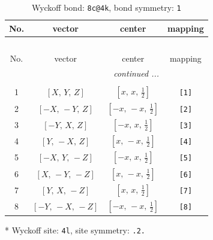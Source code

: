 \documentclass[fleqn,8pt]{jsarticle}
\begin{document}
\renewcommand{\arraystretch}{1.2}
\begin{longtable}{cccc}
\caption{Wyckoff bond: {\tt 8c@4k}, bond symmetry: {\tt 1}}
 \\
 \hline \hline
No. & vector & center & mapping \\ \hline \endfirsthead

\multicolumn{3}{l}{\tablename\ \thetable{}} \\
 \hline \hline
No. & vector & center & mapping \\ \hline \endhead

 \hline \hline
\multicolumn{3}{r}{\footnotesize\it continued ...} \\ \endfoot

 \hline \hline
\multicolumn{3}{r}{} \\ \endlastfoot

1 & $\left[ X,\, Y,\, Z \right]$ & $\left[ x,\, x,\, \frac{1}{2} \right]$ & {\tt [1]} \\ \hline
2 & $\left[ - X,\, - Y,\, Z \right]$ & $\left[ - x,\, - x,\, \frac{1}{2} \right]$ & {\tt [2]} \\ \hline
3 & $\left[ - Y,\, X,\, Z \right]$ & $\left[ - x,\, x,\, \frac{1}{2} \right]$ & {\tt [3]} \\ \hline
4 & $\left[ Y,\, - X,\, Z \right]$ & $\left[ x,\, - x,\, \frac{1}{2} \right]$ & {\tt [4]} \\ \hline
5 & $\left[ - X,\, Y,\, - Z \right]$ & $\left[ - x,\, x,\, \frac{1}{2} \right]$ & {\tt [5]} \\ \hline
6 & $\left[ X,\, - Y,\, - Z \right]$ & $\left[ x,\, - x,\, \frac{1}{2} \right]$ & {\tt [6]} \\ \hline
7 & $\left[ Y,\, X,\, - Z \right]$ & $\left[ x,\, x,\, \frac{1}{2} \right]$ & {\tt [7]} \\ \hline
8 & $\left[ - Y,\, - X,\, - Z \right]$ & $\left[ - x,\, - x,\, \frac{1}{2} \right]$ & {\tt [8]} \\
\end{longtable}
* Wyckoff site: {\tt 4l}, site symmetry: {\tt .2.}
\renewcommand{\arraystretch}{1.2}
\end{document}
